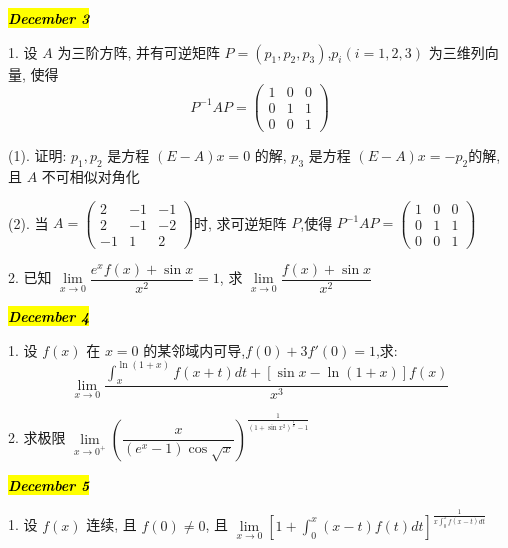 \hl{\textbf{\textit{December 3}}}

1. 设 $A$ 为三阶方阵, 并有可逆矩阵 $P=(p_{1},p_{2},p_{3})$,$p_{i}(i=1,2,3)$ 为三维列向量, 使得
$$ P^{-1}AP =
\begin{pmatrix}
	1 & 0 & 0\\
	0 & 1 & 1\\
	0 & 0 & 1
\end{pmatrix}
$$

(1). 证明: $p_{1},p_{2}$ 是方程 $(E-A)x=0$ 的解, $p_{3}$ 是方程 $(E-A)x=-p_{2}$的解, 且 $A$ 不可相似对角化

(2). 当 $A=
\begin{pmatrix}
	2 & -1 & -1\\
	2 & -1 & -2\\
   -1 &  1 &  2
\end{pmatrix}$时, 求可逆矩阵 $P$,使得 $P^{-1}AP=
\begin{pmatrix}
	1 & 0 & 0\\
	0 & 1 & 1\\
	0 & 0 & 1
\end{pmatrix}$
\begin{solution}
	
\end{solution}

2. 已知 $\lim\limits_{x\to 0}\dfrac{e^{x}f(x)+\sin x}{x^{2}}=1$, 求 $\lim\limits_{x\to 0}\dfrac{f(x)+\sin x}{x^{2}}$
\begin{solution}
	
\end{solution}

\hl{\textbf{\textit{December 4}}}

1. 设 $f(x)$ 在 $x=0$ 的某邻域内可导,$f(0)+3f'(0)=1$,求: 
$$\lim\limits_{x\to 0}\dfrac{\int_{x}^{\ln(1+x)}f(x+t)dt+[\sin x-\ln(1+x)]f(x)}{x^{3}}$$
\begin{solution}
	
\end{solution}

2. 求极限 $\lim\limits_{x\rightarrow 0^{+}}\left(\dfrac{x}{(e^{x}-1)\cos\sqrt{x}}\right)^{\frac{1}{(1+\sin x^{2})^{\frac{1}{x}}-1}}$
\begin{solution}
	
\end{solution}

\hl{\textbf{\textit{December 5}}}

1. 设 $f(x)$ 连续, 且 $f(0)\neq 0$, 且 $\lim\limits_{x\to 0}\left[1+\int_{0}^{x}(x-t)f(t)dt \right]^{\frac{1}{x\int_{0}^{x}f(x-t)dt}}$
\begin{solution}
	
\end{solution}

